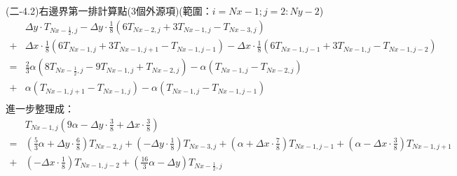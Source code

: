 \documentclass[12pt]{article}
\begin{document}
\noindent (二-4.2)右邊界第一排計算點(3個外源項)(範圍：$i = Nx-1 ; j = 2 : Ny-2$)\\
\begin{equation}
\begin{split}
  &\Delta y \cdot T_{Nx-\frac{1}{2},j}  
  - \Delta y \cdot \frac{1}{8}\left(6T_{Nx-2,j}+3T_{Nx-1,j}-T_{Nx-3,j}\right) \\
  + &\Delta x \cdot \frac{1}{8}\left(6T_{Nx-1,j}+3T_{Nx-1,j+1}-T_{Nx-1,j-1}\right)  
  - \Delta x \cdot \frac{1}{8}\left(6T_{Nx-1,j-1}+3T_{Nx-1,j}-T_{Nx-1,j-2}\right) \\
  = & \frac{2}{3}\alpha (8T_{Nx-\frac{1}{2},j}-9T_{Nx-1,j}+T_{Nx-2,j})-  \alpha (T_{Nx-1,j}-T_{Nx-2,j})\\
  + & \alpha (T_{Nx-1,j+1}-T_{Nx-1,j}) -  \alpha (T_{Nx-1,j}-T_{Nx-1,j-1}) \\
\end{split}
\end{equation}
\noindent 進一步整理成：
\begin{equation}
\begin{split}
  &T_{Nx-1,j}(9\alpha- \Delta y \cdot \frac{3}{8}+ \Delta x \cdot \frac{3}{8})\\
  =&(\frac{5}{3}\alpha + \Delta y \cdot \frac{6}{8})T_{Nx-2,j}+(- \Delta y \cdot \frac{1}{8})T_{Nx-3,j}+(\alpha+\Delta x \cdot \frac{7}{8})T_{Nx-1,j-1}+(\alpha- \Delta x \cdot \frac{3}{8})T_{Nx-1,j+1}\\
  + &(- \Delta x \cdot \frac{1}{8})T_{Nx-1,j-2}+ (\frac{16}{3}\alpha-\Delta y)T_{Nx-\frac{1}{2},j}\\
\end{split}
\end{equation}
\end{document}
